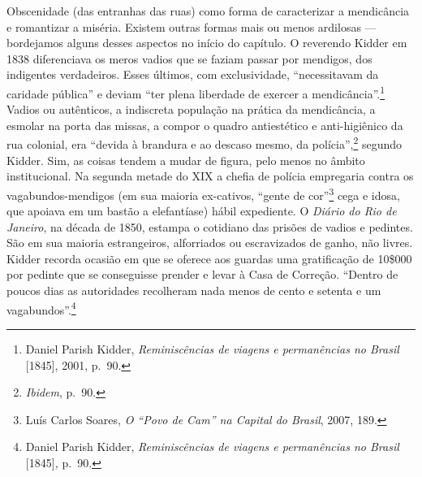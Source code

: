 Obscenidade (das entranhas das ruas) como forma de caracterizar a
mendicância e romantizar a miséria. Existem outras formas mais ou menos
ardilosas --- bordejamos alguns desses aspectos no início do capítulo. O
reverendo Kidder em 1838 diferenciava os meros vadios que se faziam
passar por mendigos, dos indigentes verdadeiros. Esses últimos, com
exclusividade, ``necessitavam da caridade pública'' e deviam ``ter plena
liberdade de exercer a mendicância''.\footnote{Daniel Parish Kidder,
  \textit{Reminiscências de viagens e permanências no Brasil} {[}1845{]},
  2001, p.~90.} Vadios ou autênticos, a indiscreta população na prática
da mendicância, a esmolar na porta das missas, a compor o quadro
antiestético e anti-higiênico da rua colonial, era ``devida à brandura e
ao descaso mesmo, da polícia'',\footnote{\textit{Ibidem}, p.~90.} segundo
Kidder. Sim, as coisas tendem a mudar de figura, pelo menos no âmbito
institucional. Na segunda metade do XIX a chefia de polícia empregaria
contra os vagabundos-mendigos (em sua maioria ex-cativos, ``gente de
cor''\footnote{Luís Carlos Soares, \textit{O ``Povo de Cam'' na Capital do
  Brasil}, 2007, 189.} cega e idosa, que apoiava em um bastão a
elefantíase) hábil expediente. O \textit{Diário do Rio de Janeiro}, na
década de 1850, estampa o cotidiano das prisões de vadios e pedintes.
São em sua maioria estrangeiros, alforriados ou escravizados de ganho,
não livres. Kidder recorda ocasião em que se oferece aos guardas uma
gratificação de 10\$000 por pedinte que se conseguisse prender e levar à
Casa de Correção. ``Dentro de poucos dias as autoridades recolheram nada
menos de cento e setenta e um vagabundos''.\footnote{Daniel Parish
  Kidder, \textit{Reminiscências de viagens e permanências no Brasil}
  {[}1845{]}\textit{,} p.~90.}

